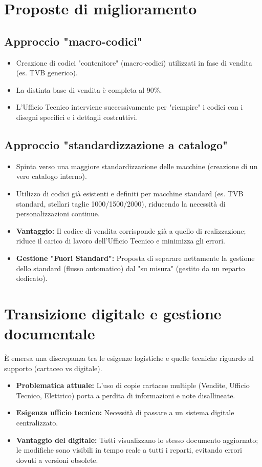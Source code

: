 \documentclass[12pt, a4paper]{article} %
\begin{document}
\section{Proposte di miglioramento}
\subsection{Approccio "macro-codici"}
\begin{itemize}
    \item Creazione di codici "contenitore" (macro-codici) utilizzati in fase di vendita
          (es. TVB generico).
    \item La distinta base di vendita è completa al 90\%.
    \item L'Ufficio Tecnico interviene successivamente per "riempire" i codici con i
          disegni specifici e i dettagli costruttivi.
\end{itemize}

\subsection{Approccio "standardizzazione a catalogo"}
\begin{itemize}
    \item Spinta verso una maggiore standardizzazione delle macchine (creazione di un
          vero catalogo interno).
    \item Utilizzo di codici già esistenti e definiti per macchine standard (es. TVB
          standard, stellari taglie 1000/1500/2000), riducendo la necessità di
          personalizzazioni continue.
    \item \textbf{Vantaggio:} Il codice di vendita corrisponde già a quello di realizzazione; riduce il carico di lavoro dell'Ufficio Tecnico e minimizza gli errori.
    \item \textbf{Gestione "Fuori Standard":} Proposta di separare nettamente la gestione dello standard (flusso automatico) dal "su misura" (gestito da un reparto dedicato).
\end{itemize}

\section{Transizione digitale e gestione documentale}
È emersa una discrepanza tra le esigenze logistiche e quelle tecniche riguardo al supporto (cartaceo vs digitale).

\begin{itemize}
    \item \textbf{Problematica attuale:} L'uso di copie cartacee multiple (Vendite, Ufficio Tecnico, Elettrico) porta a perdita di informazioni e note disallineate.
    \item \textbf{Esigenza ufficio tecnico:} Necessità di passare a un sistema digitale centralizzato.
    \item \textbf{Vantaggio del digitale:} Tutti visualizzano lo stesso documento aggiornato; le modifiche sono visibili in tempo reale a tutti i reparti, evitando errori dovuti a versioni obsolete.
\end{itemize}
\end{document}
